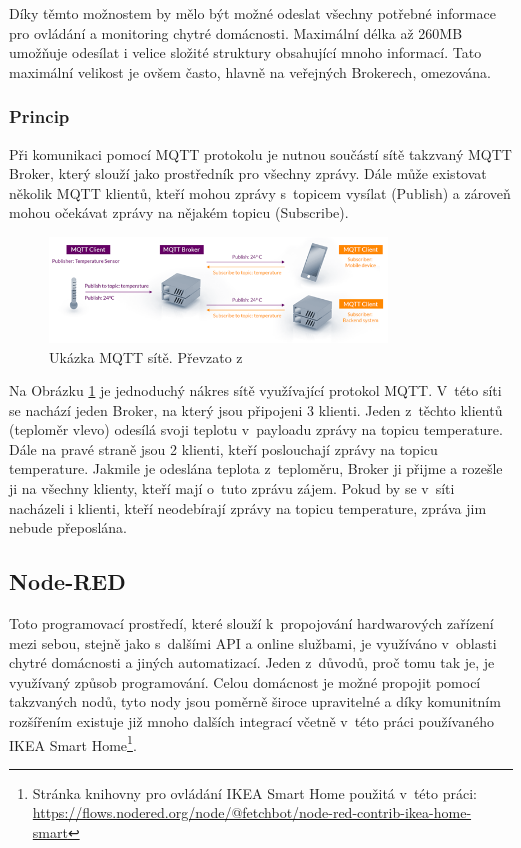 Díky těmto možnostem by mělo být možné odeslat všechny potřebné informace pro ovládání a monitoring chytré domácnosti. Maximální délka až 260MB umožňuje odesílat i velice složité struktury obsahující mnoho informací. Tato maximální velikost je ovšem často, hlavně na veřejných Brokerech, omezována\cite{mqtt-message-restriction}.

\subsubsection*{Princip}
Při komunikaci pomocí MQTT protokolu je nutnou součástí sítě takzvaný MQTT Broker, který slouží jako prostředník pro všechny zprávy. Dále může existovat několik MQTT klientů, kteří mohou zprávy s~topicem vysílat (Publish) a zároveň mohou očekávat zprávy na nějakém topicu (Subscribe).

\begin{figure}[H]
  \centering
  \includegraphics[width=0.8\textwidth]{obrazky-figures/softwareComponents/mqttNetwork.png}
  \caption{Ukázka MQTT sítě. Převzato z~\cite{MQTT}}
  \label{mqttExample}
\end{figure}

Na Obrázku \ref{mqttExample} je jednoduchý nákres sítě využívající protokol MQTT. V~této síti se nachází jeden Broker, na který jsou připojeni 3 klienti. Jeden z~těchto klientů (teploměr vlevo) odesílá svoji teplotu v~payloadu zprávy na topicu temperature. Dále na pravé straně jsou 2 klienti, kteří poslouchají zprávy na topicu temperature. Jakmile je odeslána teplota z~teploměru, Broker ji přijme a rozešle ji na všechny klienty, kteří mají o~tuto zprávu zájem. Pokud by se v~síti nacházeli i klienti, kteří neodebírají zprávy na topicu temperature, zpráva jim nebude přeposlána.

\subsection*{Node-RED}
Toto programovací prostředí, které slouží k~propojování hardwarových zařízení mezi sebou, stejně jako s~dalšími API a online službami, je využíváno v~oblasti chytré domácnosti a jiných automatizací. Jeden z~důvodů, proč tomu tak je, je využívaný způsob programování. Celou domácnost je možné propojit pomocí takzvaných nodů, tyto nody jsou poměrně široce upravitelné a díky komunitním rozšířením existuje již mnoho dalších integrací včetně v~této práci používaného IKEA Smart Home\footnote{Stránka knihovny pro ovládání IKEA Smart Home použitá v~této práci: \url{https://flows.nodered.org/node/@fetchbot/node-red-contrib-ikea-home-smart}}. 

